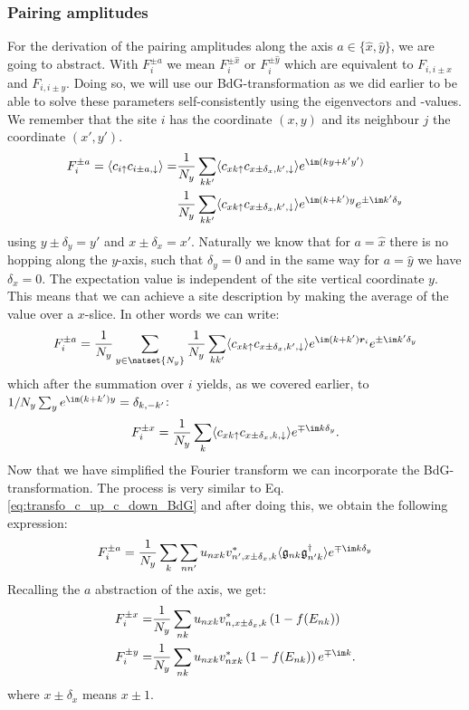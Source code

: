 \documentclass[../main.tex]{subfile}
\begin{document}
\subsubsection{Pairing amplitudes}
For the derivation of the pairing amplitudes along the axis $a\in\{\hat{x},\hat{y}\}$, we are going to abstract.
With $F_i^{\pm a}$ we mean $F_i^{\pm \hat{x}}$ or $F_i^{\pm \hat{y}}$ which are equivalent to $F_{i,i\pm x}$ and $F_{i,i\pm y}$.
Doing so, we will use our BdG-transformation as we did earlier to be 
able to solve these parameters self-consistently using the eigenvectors and -values. We remember that the site $i$ has the coordinate $(x,y)$ and its neighbour $j$
the coordinate $(x',y')$.
\begin{align*}
    F_i^{\pm a} = \langle c_{i\uparrow} c_{i\pm a,\downarrow}\rangle =& \frac{1}{N_y} \sum_{kk'} \langle c_{x k\uparrow} c_{x\pm \delta_x,k',\downarrow} \rangle e^{\im(ky + k'y')}\\
                                                                    &   \frac{1}{N_y} \sum_{kk'} \langle c_{x k\uparrow} c_{x\pm \delta_x,k',\downarrow} \rangle e^{\im(k + k')y} e^{\pm\im k' \delta_y}
\end{align*}
using $y\pm \delta_y = y'$ and $x\pm \delta_x = x'$. Naturally we know that for $a = \hat{x}$ there is no hopping along the $y$-axis, such that $\delta_y=0$ and in the same way for $a = \hat{y}$ we have $\delta_x = 0$.
The expectation value is independent of the site vertical coordinate $y$. This means that we can achieve a site description 
by making the average of the value over a $x$-slice. In other words
we can write:
\begin{equation*}
    F^{\pm a}_i = 
    \frac{1}{N_y}\sum_{y\in\natset{N_y}} \frac{1}{N_y} \sum_{kk'} \langle c_{x k\uparrow} c_{x \pm \delta_x,k',\downarrow} \rangle e^{\im(k + k')\bm{r}_i} e^{\pm\im k'\delta_y}
\end{equation*}
which after the summation over $i$ yields, as we covered earlier, to $1/N_y \sum_{y} e^{\im(k + k')y} = \delta_{k,-k'}$:
\begin{equation*}
    F^{\pm x}_i = 
    \frac{1}{N_y} \sum_{k} \langle c_{x k\uparrow} c_{x\pm \delta_x,k,\downarrow} \rangle e^{\mp\im k\delta_y}.
\end{equation*}
Now that we have simplified the Fourier transform we can incorporate the BdG-transformation. The process is very similar to Eq.\ref{eq:transfo_c_up_c_down_BdG} and after doing this,
we obtain the following expression:
\begin{equation}\label{eq:transfo_F_x}
    F^{\pm a}_i =\frac{1}{N_y}\sum_{k}\sum_{nn'} u_{nx k}v_{n',x \pm \delta_x,k}^{\ast} \langle \mathfrak{g}_{nk} \mathfrak{g}_{n'k}^{\dagger} \rangle e^{\mp\im k \delta_y}
\end{equation}
Recalling the $a$ abstraction of the axis, we get:
\begin{align}
    F^{\pm x}_i =& \frac{1}{N_y} \sum_{nk} u_{nx k} v_{n,x\pm \delta_x,k}^{\ast}\left(1 - f(E_{nk})\right)\\
    F^{\pm y}_i =& \frac{1}{N_y} \sum_{nk} u_{nx k} v_{n x k}^{\ast}\left(1 - f(E_{nk})\right) e^{\mp \im k}.
\end{align}
where $x\pm \delta_x$ means $x\pm1$.
\end{document}
